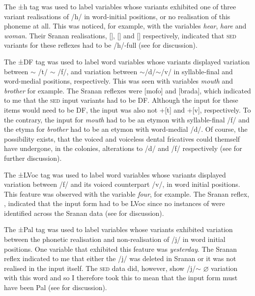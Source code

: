 {The {±h} tag was used to label variables whose variants exhibited one of three variant realisations of /h/ in word-initial positions, or no realisation of this phoneme at all. This was noticed, for example, with the variables \emph{hear}, \emph{hare} and \emph{woman}. Their Sranan realisations, [], [] and [] respectively, indicated that \textsc{sed} variants for these reflexes had to be /h/-full (see  for discussion).

The {±DF} tag was used to label word variables whose variants displayed variation between  $\sim$ /t/ $\sim$ /f/, and variation between $\sim$/d/$\sim$/v/ in syllable-final and word-medial positions, respectively. This was seen with variables \emph{mouth} and \emph{brother} for example. The Sranan reflexes were [mofo] and [brada], which indicated to me that the \textsc{sed} input variants had to be \textminus DF. Although the input for these items would need to be \textminus DF, the input was also not +[t] and +[v], respectively. To the contrary, the input for \emph{mouth}  had to be an etymon with syllable-final /f/ and the etyma for \emph{brother}  had to be an etymon with word-medial /d/. Of course, the possibility exists, that the voiced and voiceless dental fricatives could themself have undergone, in the colonies, alterations to /d/ and /f/ respectively (see  for further discussion).

The {±LVoc} tag was used to label word variables whose variants displayed variation between /f/ and its voiced counterpart /v/, in word initial positions. This feature was observed with the variable \emph{four}, for example. The Sranan reflex, \textipa{[fO]}, indicated that the input form had to be \textminus LVoc since no instances of \textipa{[fO]} were identified across the Sranan data (see  for discussion).

The {±Pal} tag was used to label variables whose variants exhibited variation between the phonetic realisation and non-realisation of /j/ in word initial positions. One variable that exhibited this feature was \emph{yesterday}. The Sranan reflex \textipa{[esrede]}  indicated to me that either the /j/ was deleted in Sranan or it was not realised in the input itself. The \textsc{sed} data did, however, show /j/$\sim$ $\varnothing$ variation with this word and so I therefore took this to mean that the input form must have been \textminus Pal (see  for discussion).

}
